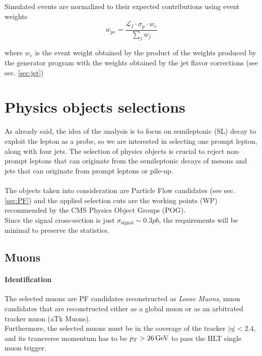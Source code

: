 Simulated events are normalized to
their expected contributions using event weights 
\begin{equation}
    w_{pe}=\frac{\mathcal{L}_I \cdot \sigma_p \cdot w_{e} }{\sum_j w_{j}}
\end{equation}

where $w_{e}$ is the event weight obtained by the product of the weights produced by the generator program with the weights obtained by the jet flavor corrections (see sec. \ref{sec:jet})   

\section{Physics objects selections}
As already said, the idea of the analysis is to focus on semileptonic (SL) decay to exploit the lepton as a probe, so we are interested in selecting one prompt lepton, along with four jets.
The selection of physics objects is crucial to reject non-prompt leptons that can originate from the semileptonic decays of mesons and jets that can originate from prompt leptons or pile-up.\\
\\
The objects taken into consideration are Particle Flow candidates (see sec. \ref{sec:PF}) and the applied selection cuts are the working points (WP) recommended by the CMS Physics Object Groups (POG).\\
Since the signal cross-section is just $\sigma_{\text{signal}}\sim 0.3 pb$, the requirements will be minimal to preserve the statistics. 
\subsection{Muons}
\paragraph*{Identification}
The selected muons are PF candidates reconstructed as \emph{Loose Muons}, \ie muon candidates that are reconstructed either as a global muon or as an arbitrated tracker muon (aTk Muons)\footnotemark.\\
Furthermore, the selected muons must be in the coverage of the tracker $|\eta|<2.4$, and its transverse momentum has to be $p_T>26{\,\text{Ge\hspace{-.08em}V}}$ to pass the HLT single muon trigger.
